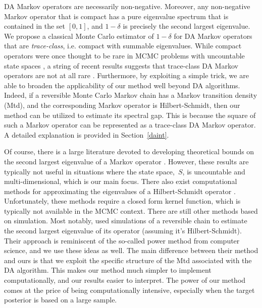 \documentclass[11pt]{article}
\begin{document}
        DA Markov operators are necessarily non-negative.  Moreover,
        any non-negative Markov operator that is compact has a pure
        eigenvalue spectrum that is contained in the set $[0,1]$, and
        $1-\delta$ is precisely the second largest eigenvalue.  We
        propose a classical Monte Carlo estimator of $1-\delta$ for DA
        Markov operators that are \textit{trace-class}, i.e. compact
        with summable eigenvalues.  While compact operators were once
        thought to be rare in MCMC problems with uncountable state
        spaces \citep{chan1994discussion}, a string of recent results
        suggests that trace-class DA Markov operators are not at all
        rare \citep[see
        e.g.][]{qin2016trace,chakraborty2016convergence,choi2017anova,paltrace}.
        Furthermore, by exploiting a simple trick, we are able to
        broaden the applicability of our method well beyond DA
        algorithms.  Indeed, if a reversible Monte Carlo Markov chain
        has a Markov transition density (Mtd), and the corresponding
        Markov operator is Hilbert-Schmidt, then our method can be
        utilized to estimate its spectral gap.  This is because the
        square of such a Markov operator can be represented as a
        trace-class DA Markov operator.  A detailed explanation is
        provided in Section~\ref{daint}.

	Of course, there is a large literature devoted to developing
        theoretical bounds on the second largest eigenvalue of a
        Markov operator \citep[see e.g.][]{lawler1988bounds,
          sinclair1989approximate, diaconis1991geometric}. However,
        these results are typically not useful in situations where the
        state space,~$S$, is uncountable and multi-dimensional, which
        is our main focus. There also exist computational methods for
        approximating the eigenvalues of a Hilbert-Schmidt operator
        \citep[see e.g.][\S
        4.2]{koltchinskii2000random,ahues2001spectral}. Unfortunately,
        these methods require a closed form kernel function, which is
        typically not available in the MCMC context. There are still
        other methods based on simulation. Most notably,
        \cite{garren2000estimating} used simulations of a reversible
        chain to estimate the second largest eigenvalue of its
        operator (assuming it's Hilbert-Schmidt). Their approach is
        reminiscent of the so-called power method from computer
        science, and we use these ideas as well.  The main difference
        between their method and ours is that we exploit the specific
        structure of the Mtd associated with the DA algorithm. This
        makes our method much simpler to implement computationally,
        and our results easier to interpret.  The power of our method
        comes at the price of being computationally intensive,
        especially when the target posterior is based on a large
        sample.
	
\end{document}
